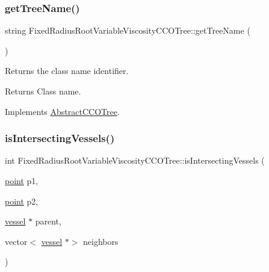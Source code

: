 \subsubsection{\texorpdfstring{get\+Tree\+Name()}{getTreeName()}}
{\footnotesize\ttfamily string Fixed\+Radius\+Root\+Variable\+Viscosity\+C\+C\+O\+Tree\+::get\+Tree\+Name (\begin{DoxyParamCaption}{ }\end{DoxyParamCaption})\hspace{0.3cm}{\ttfamily [virtual]}}

Returns the class name identifier. \begin{DoxyReturn}{Returns}
Class name. 
\end{DoxyReturn}


Implements \mbox{\hyperlink{class_abstract_c_c_o_tree_aa044337119c45985addba3ff7d554de2}{Abstract\+C\+C\+O\+Tree}}.

\mbox{\label{class_fixed_radius_root_variable_viscosity_c_c_o_tree_a6696183498a4e6479d33bb61a3dcfffa}} 
\subsubsection{\texorpdfstring{is\+Intersecting\+Vessels()}{isIntersectingVessels()}}
{\footnotesize\ttfamily int Fixed\+Radius\+Root\+Variable\+Viscosity\+C\+C\+O\+Tree\+::is\+Intersecting\+Vessels (\begin{DoxyParamCaption}\item[{\mbox{\hyperlink{structpoint}{point}}}]{p1,  }\item[{\mbox{\hyperlink{structpoint}{point}}}]{p2,  }\item[{\mbox{\hyperlink{structvessel}{vessel}} $\ast$}]{parent,  }\item[{vector$<$ \mbox{\hyperlink{structvessel}{vessel}} $\ast$$>$}]{neighbors }\end{DoxyParamCaption})\hspace{0.3cm}{\ttfamily [private]}}

